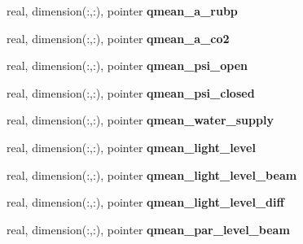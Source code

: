 \begin{DoxyCompactItemize}
\item 
\hypertarget{structed__state__vars_1_1patchtype_aa08494c7d33b9eaba4ef693592bde13e}{
real, dimension(:,:), pointer {\bfseries qmean\_\-a\_\-rubp}}
\label{structed__state__vars_1_1patchtype_aa08494c7d33b9eaba4ef693592bde13e}

\item 
\hypertarget{structed__state__vars_1_1patchtype_a523d514ee73d49f6e17ea8c3317ada9c}{
real, dimension(:,:), pointer {\bfseries qmean\_\-a\_\-co2}}
\label{structed__state__vars_1_1patchtype_a523d514ee73d49f6e17ea8c3317ada9c}

\item 
\hypertarget{structed__state__vars_1_1patchtype_a20d788613b5642d5feb6efec2308d5df}{
real, dimension(:,:), pointer {\bfseries qmean\_\-psi\_\-open}}
\label{structed__state__vars_1_1patchtype_a20d788613b5642d5feb6efec2308d5df}

\item 
\hypertarget{structed__state__vars_1_1patchtype_acc22edc71864c04f6e28d3e2bcfb569f}{
real, dimension(:,:), pointer {\bfseries qmean\_\-psi\_\-closed}}
\label{structed__state__vars_1_1patchtype_acc22edc71864c04f6e28d3e2bcfb569f}

\item 
\hypertarget{structed__state__vars_1_1patchtype_a4e5383559bf6fb73502301d1c0d33f1a}{
real, dimension(:,:), pointer {\bfseries qmean\_\-water\_\-supply}}
\label{structed__state__vars_1_1patchtype_a4e5383559bf6fb73502301d1c0d33f1a}

\item 
\hypertarget{structed__state__vars_1_1patchtype_a7bdb71d8260599394fdf6a8b4872d501}{
real, dimension(:,:), pointer {\bfseries qmean\_\-light\_\-level}}
\label{structed__state__vars_1_1patchtype_a7bdb71d8260599394fdf6a8b4872d501}

\item 
\hypertarget{structed__state__vars_1_1patchtype_a6ee25dbce96be774d86693080248a97f}{
real, dimension(:,:), pointer {\bfseries qmean\_\-light\_\-level\_\-beam}}
\label{structed__state__vars_1_1patchtype_a6ee25dbce96be774d86693080248a97f}

\item 
\hypertarget{structed__state__vars_1_1patchtype_a18aa1fdc8ed1ab0353d9bd5a44cf8647}{
real, dimension(:,:), pointer {\bfseries qmean\_\-light\_\-level\_\-diff}}
\label{structed__state__vars_1_1patchtype_a18aa1fdc8ed1ab0353d9bd5a44cf8647}

\item 
\hypertarget{structed__state__vars_1_1patchtype_aee9b2a34cf9d5a295462c5b2a20ccaa6}{
real, dimension(:,:), pointer {\bfseries qmean\_\-par\_\-level\_\-beam}}
\label{structed__state__vars_1_1patchtype_aee9b2a34cf9d5a295462c5b2a20ccaa6}


\end{DoxyCompactItemize}
